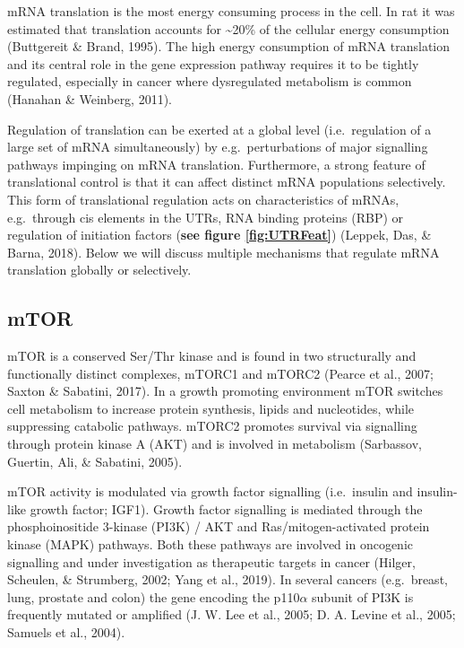 \documentclass[
  12pt,
  openany]{book}
\begin{document}
mRNA translation is the most energy consuming process in the cell. In rat it was estimated that translation accounts for \textasciitilde20\% of the cellular energy consumption (Buttgereit \& Brand, 1995). The high energy consumption of mRNA translation and its central role in the gene expression pathway requires it to be tightly regulated, especially in cancer where dysregulated metabolism is common (Hanahan \& Weinberg, 2011).

Regulation of translation can be exerted at a global level (i.e.~regulation of a large set of mRNA simultaneously) by e.g.~perturbations of major signalling pathways impinging on mRNA translation. Furthermore, a strong feature of translational control is that it can affect distinct mRNA populations selectively. This form of translational regulation acts on characteristics of mRNAs, e.g.~through cis elements in the UTRs, RNA binding proteins (RBP) or regulation of initiation factors (\textbf{see figure \ref{fig:UTRFeat}}) (Leppek, Das, \& Barna, 2018). Below we will discuss multiple mechanisms that regulate mRNA translation globally or selectively.

\subsection{mTOR} \label{mTOR}

mTOR is a conserved Ser/Thr kinase and is found in two structurally and functionally distinct complexes, mTORC1 and mTORC2 (Pearce et al., 2007; Saxton \& Sabatini, 2017). In a growth promoting environment mTOR switches cell metabolism to increase protein synthesis, lipids and nucleotides, while suppressing catabolic pathways. mTORC2 promotes survival via signalling through protein kinase A (AKT) and is involved in metabolism (Sarbassov, Guertin, Ali, \& Sabatini, 2005).

mTOR activity is modulated via growth factor signalling (i.e.~insulin and insulin-like growth factor; IGF1). Growth factor signalling is mediated through the phosphoinositide 3-kinase (PI3K) / AKT and Ras/mitogen-activated protein kinase (MAPK) pathways. Both these pathways are involved in oncogenic signalling and under investigation as therapeutic targets in cancer (Hilger, Scheulen, \& Strumberg, 2002; Yang et al., 2019). In several cancers (e.g.~breast, lung, prostate and colon) the gene encoding the p110\(\alpha\) subunit of PI3K is frequently mutated or amplified (J. W. Lee et al., 2005; D. A. Levine et al., 2005; Samuels et al., 2004).
\end{document}
